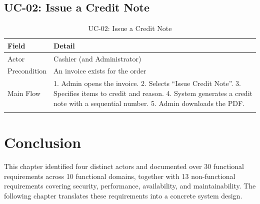 \subsection{UC-02: Issue a Credit Note}

\begin{longtable}{|m{3.5cm}|m{10cm}|}
    \hline
    \textbf{Field} & \textbf{Detail}                                                                                                                                                                                \\
    \hline
    \endhead
    \endfoot
    \endlastfoot
    \hline
    Actor          & Cashier (and Administrator)                                                                                                                                                                    \\
    \hline
    Precondition   & An invoice exists for the order                                                                                                                                                                \\
    \hline
    Main Flow      & 1. Admin opens the invoice. 2. Selects ``Issue Credit Note''. 3. Specifies items to credit and reason. 4. System generates a credit note with a sequential number. 5. Admin downloads the PDF. \\
    \hline
    \caption{UC-02: Issue a Credit Note}
    \label{tab:uc02}
\end{longtable}

\section*{Conclusion}
This chapter identified four distinct actors and documented over 30 functional
requirements across 10 functional domains, together with 13 non-functional requirements
covering security, performance, availability, and maintainability. The following
chapter translates these requirements into a concrete system design.
